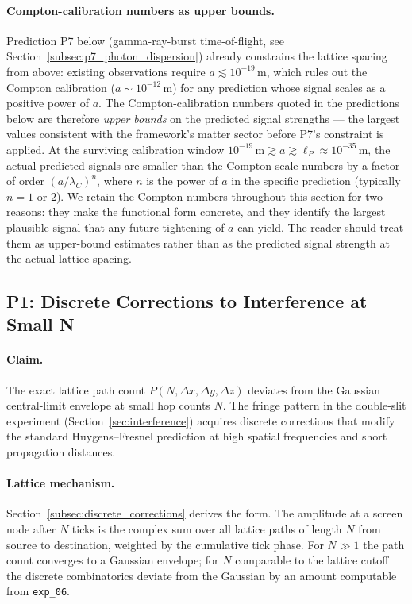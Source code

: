 \paragraph{Compton-calibration numbers as upper bounds.}
Prediction P7 below (gamma-ray-burst time-of-flight, see
Section~\ref{subsec:p7_photon_dispersion}) already constrains the
lattice spacing from above: existing observations require
$a \lesssim 10^{-19}\,\text{m}$, which rules out the Compton
calibration ($a \sim 10^{-12}\,\text{m}$) for any prediction whose
signal scales as a positive power of $a$.
The Compton-calibration numbers quoted in the predictions below are
therefore \emph{upper bounds} on the predicted signal strengths ---
the largest values consistent with the framework's matter sector
before P7's constraint is applied.
At the surviving calibration window
$10^{-19}\,\text{m} \gtrsim a \gtrsim \ell_P \approx 10^{-35}\,\text{m}$,
the actual predicted signals are smaller than the Compton-scale
numbers by a factor of order $(a/\lambda_C)^n$, where $n$ is the
power of $a$ in the specific prediction (typically $n = 1$ or $2$).
We retain the Compton numbers throughout this section for two
reasons: they make the functional form concrete, and they identify
the largest plausible signal that any future tightening of $a$ can
yield. The reader should treat them as upper-bound estimates rather
than as the predicted signal strength at the actual lattice
spacing.

\subsection{P1: Discrete Corrections to Interference at Small N}
\label{subsec:p1_interference}

\paragraph{Claim.}
The exact lattice path count $P(N, \Delta x, \Delta y, \Delta z)$
deviates from the Gaussian central-limit envelope at small hop
counts $N$. The fringe pattern in the double-slit experiment
(Section~\ref{sec:interference}) acquires discrete corrections that
modify the standard Huygens--Fresnel prediction at high spatial
frequencies and short propagation distances.

\paragraph{Lattice mechanism.}
Section~\ref{subsec:discrete_corrections} derives the form. The
amplitude at a screen node after $N$ ticks is the complex sum over
all lattice paths of length $N$ from source to destination,
weighted by the cumulative tick phase. For $N \gg 1$ the path count
converges to a Gaussian envelope; for $N$ comparable to the lattice
cutoff the discrete combinatorics deviate from the Gaussian by an
amount computable from \texttt{exp\_06}.

